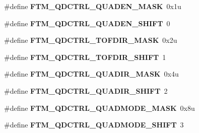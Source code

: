 \begin{DoxyCompactItemize}
\item 
\#define {\bfseries F\+T\+M\+\_\+\+Q\+D\+C\+T\+R\+L\+\_\+\+Q\+U\+A\+D\+E\+N\+\_\+\+M\+A\+SK}~0x1u\hypertarget{group__FTM__Register__Masks_ga130e81d72e324d2e47e6613071606c4c}{}\label{group__FTM__Register__Masks_ga130e81d72e324d2e47e6613071606c4c}

\item 
\#define {\bfseries F\+T\+M\+\_\+\+Q\+D\+C\+T\+R\+L\+\_\+\+Q\+U\+A\+D\+E\+N\+\_\+\+S\+H\+I\+FT}~0\hypertarget{group__FTM__Register__Masks_gae39df93f832b0d790301964418e74938}{}\label{group__FTM__Register__Masks_gae39df93f832b0d790301964418e74938}

\item 
\#define {\bfseries F\+T\+M\+\_\+\+Q\+D\+C\+T\+R\+L\+\_\+\+T\+O\+F\+D\+I\+R\+\_\+\+M\+A\+SK}~0x2u\hypertarget{group__FTM__Register__Masks_ga0bab5d224dd3ac34bd2c827f96c60b14}{}\label{group__FTM__Register__Masks_ga0bab5d224dd3ac34bd2c827f96c60b14}

\item 
\#define {\bfseries F\+T\+M\+\_\+\+Q\+D\+C\+T\+R\+L\+\_\+\+T\+O\+F\+D\+I\+R\+\_\+\+S\+H\+I\+FT}~1\hypertarget{group__FTM__Register__Masks_ga6d666900b5d312877cc343dbc58969b0}{}\label{group__FTM__Register__Masks_ga6d666900b5d312877cc343dbc58969b0}

\item 
\#define {\bfseries F\+T\+M\+\_\+\+Q\+D\+C\+T\+R\+L\+\_\+\+Q\+U\+A\+D\+I\+R\+\_\+\+M\+A\+SK}~0x4u\hypertarget{group__FTM__Register__Masks_gac6c87f5278eaf7f6c4121ec5a3b316a5}{}\label{group__FTM__Register__Masks_gac6c87f5278eaf7f6c4121ec5a3b316a5}

\item 
\#define {\bfseries F\+T\+M\+\_\+\+Q\+D\+C\+T\+R\+L\+\_\+\+Q\+U\+A\+D\+I\+R\+\_\+\+S\+H\+I\+FT}~2\hypertarget{group__FTM__Register__Masks_ga31c6ba1b172d97e71ecd42ce6a8978ed}{}\label{group__FTM__Register__Masks_ga31c6ba1b172d97e71ecd42ce6a8978ed}

\item 
\#define {\bfseries F\+T\+M\+\_\+\+Q\+D\+C\+T\+R\+L\+\_\+\+Q\+U\+A\+D\+M\+O\+D\+E\+\_\+\+M\+A\+SK}~0x8u\hypertarget{group__FTM__Register__Masks_gaaee693e052290f94ba226027a39f3bbd}{}\label{group__FTM__Register__Masks_gaaee693e052290f94ba226027a39f3bbd}

\item 
\#define {\bfseries F\+T\+M\+\_\+\+Q\+D\+C\+T\+R\+L\+\_\+\+Q\+U\+A\+D\+M\+O\+D\+E\+\_\+\+S\+H\+I\+FT}~3\hypertarget{group__FTM__Register__Masks_ga70e29e6856263443f9415464e8c88d35}{}\label{group__FTM__Register__Masks_ga70e29e6856263443f9415464e8c88d35}


\end{DoxyCompactItemize}
